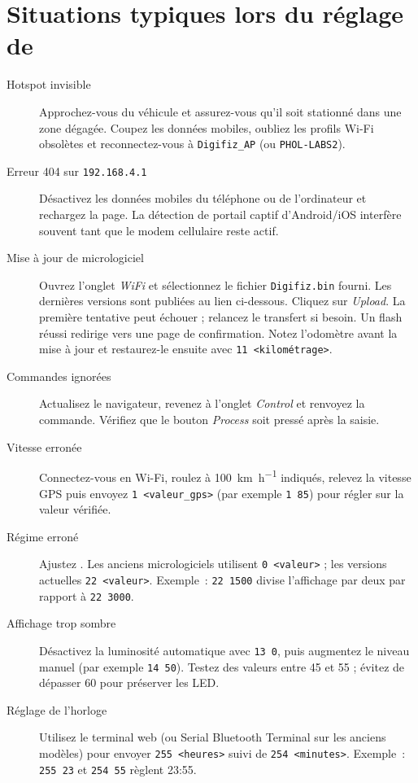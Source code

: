 \chapter{Situations typiques lors du réglage de \ReplicaNextShort{}}\label{ch:replica-next-scenarios}

\begin{description}
    \item[Hotspot invisible] Approchez-vous du véhicule et assurez-vous qu'il soit stationné dans une zone dégagée. Coupez les données mobiles, oubliez les profils Wi-Fi obsolètes et reconnectez-vous à \texttt{Digifiz\_AP} (ou \texttt{PHOL-LABS2}).
    \item[Erreur 404 sur \texttt{192.168.4.1}] Désactivez les données mobiles du téléphone ou de l'ordinateur et rechargez la page. La détection de portail captif d'Android/iOS interfère souvent tant que le modem cellulaire reste actif.
    \item[Mise à jour de micrologiciel] Ouvrez l'onglet \emph{WiFi} et sélectionnez le fichier \texttt{Digifiz.bin} fourni. Les dernières versions sont publiées au lien ci-dessous.
        Cliquez sur \emph{Upload}. La première tentative peut échouer ; relancez le transfert si besoin. Un flash réussi redirige vers une page de confirmation. Notez l'odomètre avant la mise à jour et restaurez-le ensuite avec \verb|11 <kilométrage>|.
    \item[Commandes ignorées] Actualisez le navigateur, revenez à l'onglet \emph{Control} et renvoyez la commande. Vérifiez que le bouton \emph{Process} soit pressé après la saisie.
    \item[Vitesse erronée] Connectez-vous en Wi-Fi, roulez à \SI{100}{\kilo\metre\per\hour} indiqués, relevez la vitesse GPS puis envoyez \verb|1 <valeur_gps>| (par exemple \verb|1 85|) pour régler  sur la valeur vérifiée.
    \item[Régime erroné] Ajustez . Les anciens micrologiciels utilisent \verb|0 <valeur>| ; les versions actuelles \verb|22 <valeur>|. Exemple~: \verb|22 1500| divise l'affichage par deux par rapport à \verb|22 3000|.
    \item[Affichage trop sombre] Désactivez la luminosité automatique avec \verb|13 0|, puis augmentez le niveau manuel (par exemple \verb|14 50|). Testez des valeurs entre 45 et 55 ; évitez de dépasser 60 pour préserver les LED.
    \item[Réglage de l'horloge] Utilisez le terminal web (ou Serial Bluetooth Terminal sur les anciens modèles) pour envoyer \verb|255 <heures>| suivi de \verb|254 <minutes>|. Exemple~: \verb|255 23| et \verb|254 55| règlent 23:55.

\end{description}
